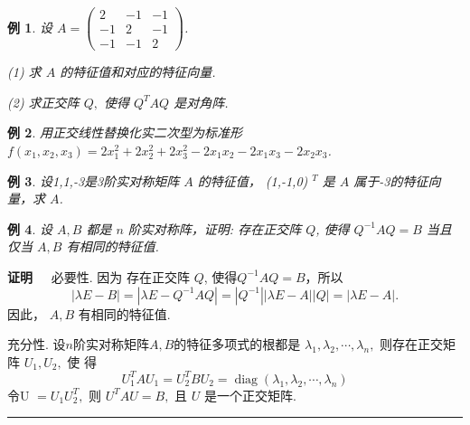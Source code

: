 \documentclass[13pt]{beamer}
\newtheorem{exa}{例}
\def\qed{\nopagebreak\hfill{\rule{4pt}{7pt}}\medbreak}
\def\pf{{\bf 证明~~ }}
\begin{document}
	\setcounter{exa}{0}

\begin{frame}
\begin{exa}
设 $A=\left(\begin{array}{ccc}2 & -1 & -1 \\ -1 & 2 & -1 \\ -1 & -1 & 2\end{array}\right)$.

(1) 求 $A$ 的特征值和对应的特征向量.

(2) 求正交阵 $Q,$ 使得 $Q^{T} A Q$ 是对角阵.
\end{exa}

\begin{exa}
 用正交线性替换化实二次型为标准形 $f\left(x_{1}, x_{2}, x_{3}\right)=2 x_{1}^{2}+2 x_{2}^{2}+2 x_{3}^{2}-2 x_{1} x_{2}-2 x_{1} x_{3}-2 x_{2} x_{3}$.
\end{exa}

\begin{exa}
	设1,1,-3是3阶实对称矩阵 $A$ 的特征值， (1,-1,0) $^{T}$ 是 $A$ 属于-3的特征向量，求 $A$.
\end{exa}
\end{frame}


\begin{frame}



\begin{exa}
设 $A, B$ 都是 $n$ 阶实对称阵，证明: 存在正交阵 $Q$, 使得 $Q^{-1} A Q=B$ 当且仅当 $A, B$ 有相同的特征值.
\end{exa}

\pf 必要性. 因为 存在正交阵 $Q$, 使得$Q^{-1} A Q=B$，所以$$|\lambda E-B| = |\lambda E-Q^{-1} A Q|= |Q^{-1}| |\lambda E- A | |Q|  = |\lambda E- A |.$$
因此， $A, B$ 有相同的特征值.

充分性.
 设$n$阶实对称矩阵$A, B$的特征多项式的根都是 $\lambda_{1}, \lambda_{2}, \cdots, \lambda_{n},$ 则存在正交矩阵 $U_{1}, U_{2},$ 使
得
\[
U_{1}^{T} A U_{1}=U_{2}^{T} B U_{2}=\operatorname{diag}\left(\lambda_{1}, \lambda_{2}, \cdots, \lambda_{n}\right)
\]
令U $=U_{1} U_{2}^{T},$ 则 $U^{T} A U=B,$ 且 $U$ 是一个正交矩阵.
\qed
\end{frame}
\end{document}
